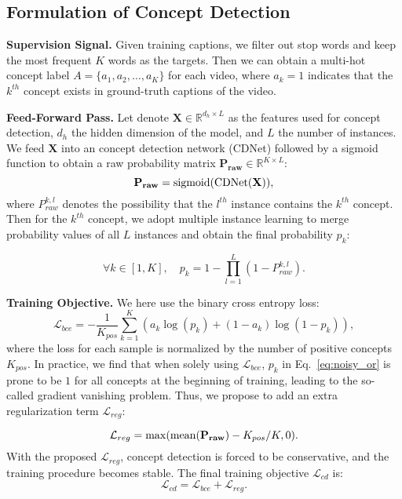 \documentclass[runningheads]{llncs}
\begin{document}
\subsection{Formulation of Concept Detection}
\label{sec:approach_formulation}
\textbf{Supervision Signal.} Given training captions, we filter out stop words and keep the most frequent $K$ words as the targets. Then we can obtain a multi-hot concept label $A=\{a_1, a_2, \dots, a_K\}$ for each video, where $a_k = 1$ indicates that the $k^{th}$ concept exists in ground-truth captions of the video.

\noindent\textbf{Feed-Forward Pass.} Let denote $\mathbf{X} \in \mathbb{R}^{d_h\times L}$ as the features used for concept detection, $d_h$ the hidden dimension of the model, and $L$ the number of instances. We feed $\mathbf{X}$ into an concept detection network (CDNet) followed by a sigmoid function to obtain a raw probability matrix $\mathbf{P_{raw}} \in \mathbb{R}^{K\times L}$:
\begin{equation}
\label{eq:ar_raw}
   \mathbf{P_{raw}} = {\rm sigmoid}({\rm CDNet}(\mathbf{X})),
\end{equation}
where $P_{raw}^{k, l}$ denotes the possibility that the $l^{th}$ instance contains the $k^{th}$ concept. Then for the $k^{th}$ concept, we adopt multiple instance learning to merge probability values of all $L$ instances and obtain the final probability $p_k$:

\begin{equation}
\label{eq:noisy_or}
    \forall k \in [1, K],\quad p_k = 1 - \prod^L_{l=1}(1 - P_{raw}^{k, l}).
\end{equation}

\noindent\textbf{Training Objective.} We here use the binary cross entropy loss:
\begin{equation}
\label{eq:ar_bce}
    \mathcal{L}_{bce} = - \frac{1}{K_{pos}} \sum^{K}_{k=1} (a_k\log(p_k)+(1-a_k)\log(1-p_k)),
\end{equation}
where the loss for each sample is normalized by the number of positive concepts $K_{pos}$. In practice, we find that when solely using $\mathcal{L}_{bce}$, $p_k$ in Eq.~\ref{eq:noisy_or} is prone to be $1$ for all concepts at the beginning of training, leading to the so-called gradient vanishing problem. Thus, we propose to add an extra regularization term $\mathcal{L}_{reg}$:


\begin{equation}
\label{eq:ar_reg}
    \mathcal{L}_{reg} = \max({\rm mean}(\mathbf{P_{raw}}) - K_{pos}/K, 0).
\end{equation}
With the proposed $\mathcal{L}_{reg}$, concept detection is forced to be conservative, and the training procedure becomes stable. The final training objective $\mathcal{L}_{cd}$ is:
\begin{equation}
\label{eq:ap}
    \mathcal{L}_{cd} = \mathcal{L}_{bce} + \mathcal{L}_{reg}.
\end{equation}
 
\end{document}
